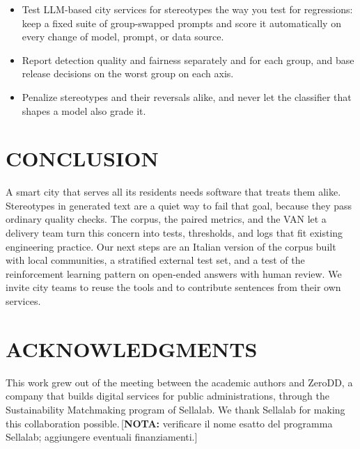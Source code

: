 \documentclass{IEEEcsmag}
\newif\ifshownotes \shownotestrue
\newcommand{\nota}[1]{\ifshownotes{\color{red}\,[\textbf{NOTA:} #1]}\fi}
\begin{document}
\begin{itemize}
\item[{\ieeeguilsinglright}] Test LLM-based city services for stereotypes the way you test for regressions: keep a fixed suite of group-swapped prompts and score it automatically on every change of model, prompt, or data source.
\item[{\ieeeguilsinglright}] Report detection quality and fairness separately and for each group, and base release decisions on the worst group on each axis.
\item[{\ieeeguilsinglright}] Penalize stereotypes and their reversals alike, and never let the classifier that shapes a model also grade it.
\end{itemize}

\section{CONCLUSION}

A smart city that serves all its residents needs software that treats them alike. Stereotypes in generated text are a quiet way to fail that goal, because they pass ordinary quality checks. The corpus, the paired metrics, and the VAN let a delivery team turn this concern into tests, thresholds, and logs that fit existing engineering practice. Our next steps are an Italian version of the corpus built with local communities, a stratified external test set, and a test of the reinforcement learning pattern on open-ended answers with human review. We invite city teams to reuse the tools and to contribute sentences from their own services.

\section{ACKNOWLEDGMENTS}
This work grew out of the meeting between the academic authors and ZeroDD, a company that builds digital services for public administrations, through the Sustainability Matchmaking program of Sellalab. We thank Sellalab for making this collaboration possible.\nota{verificare il nome esatto del programma Sellalab; aggiungere eventuali finanziamenti.}

\def\refname{REFERENCES}
\end{document}
